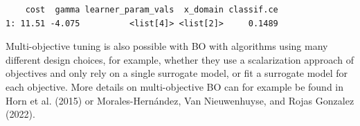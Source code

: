 \begin{Shaded}
\begin{Highlighting}[]
\OtherTok{=} \NormalTok{(}\NormalTok{,}

\OtherTok{=} \NormalTok{(}\NormalTok{, } \NormalTok{,}
   \NormalTok{,}
   \NormalTok{(}\NormalTok{, }\NormalTok{, } \NormalTok{),}
   \NormalTok{(}\NormalTok{, }\NormalTok{, } \NormalTok{)}
\NormalTok{)}

\OtherTok{=} \NormalTok{(}\NormalTok{(}\NormalTok{, } \NormalTok{),}
  \NormalTok{(}\NormalTok{), }\NormalTok{)}

\SpecialCharTok{$}
\end{Highlighting}
\end{Shaded}

\begin{verbatim}
    cost  gamma learner_param_vals  x_domain classif.ce
1: 11.51 -4.075          <list[4]> <list[2]>     0.1489
\end{verbatim}

Multi-objective tuning is also possible with BO with algorithms using
many different design choices, for example, whether they use a
scalarization approach of objectives and only rely on a single surrogate
model, or fit a surrogate model for each objective. More details on
multi-objective BO can for example be found in Horn et al. (2015) or
Morales-Hernández, Van Nieuwenhuyse, and Rojas Gonzalez (2022).


